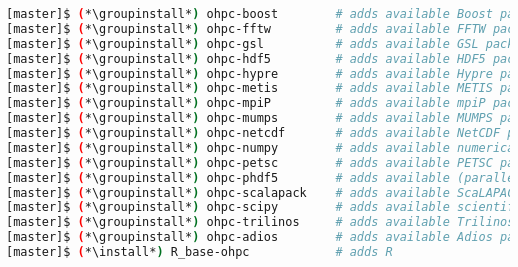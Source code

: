 \begin{lstlisting}[language=bash,keywords={},upquote=true,keepspaces]
[master]$ (*\groupinstall*) ohpc-boost        # adds available Boost packages
[master]$ (*\groupinstall*) ohpc-fftw         # adds available FFTW packages
[master]$ (*\groupinstall*) ohpc-gsl          # adds available GSL packages
[master]$ (*\groupinstall*) ohpc-hdf5         # adds available HDF5 packages
[master]$ (*\groupinstall*) ohpc-hypre        # adds available Hypre packages
[master]$ (*\groupinstall*) ohpc-metis        # adds available METIS packages
[master]$ (*\groupinstall*) ohpc-mpiP         # adds available mpiP packages
[master]$ (*\groupinstall*) ohpc-mumps        # adds available MUMPS packages
[master]$ (*\groupinstall*) ohpc-netcdf       # adds available NetCDF packages
[master]$ (*\groupinstall*) ohpc-numpy        # adds available numerical Python packages
[master]$ (*\groupinstall*) ohpc-petsc        # adds available PETSC packages
[master]$ (*\groupinstall*) ohpc-phdf5        # adds available (parallel) HDF5 packages
[master]$ (*\groupinstall*) ohpc-scalapack    # adds available ScaLAPACK packages
[master]$ (*\groupinstall*) ohpc-scipy        # adds available scientific Python packages
[master]$ (*\groupinstall*) ohpc-trilinos     # adds available Trilinos packages
[master]$ (*\groupinstall*) ohpc-adios        # adds available Adios packages
[master]$ (*\install*) R_base-ohpc            # adds R
\end{lstlisting}
